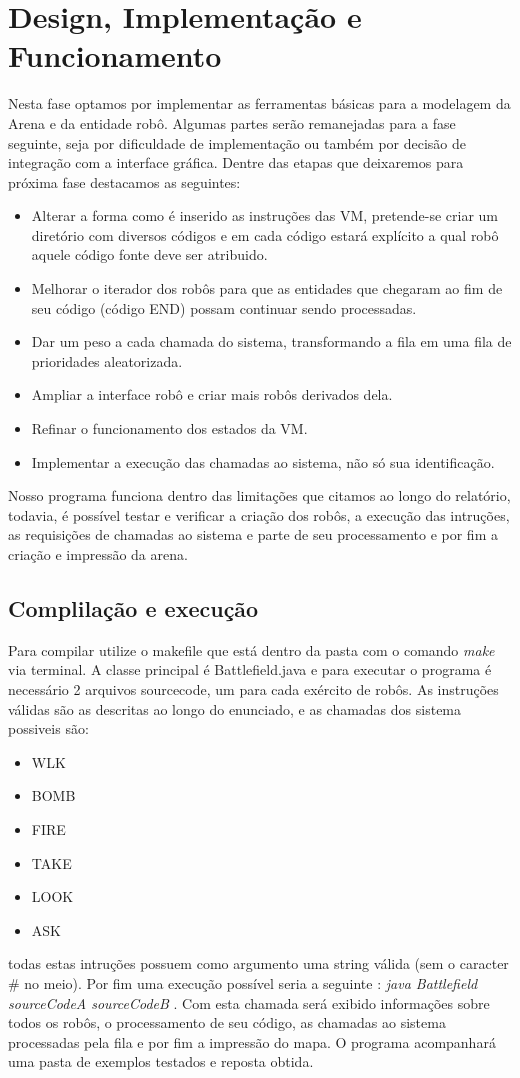 \documentclass[a4paper]{article}
\begin{document}
\section{Design, Implementação e Funcionamento }
Nesta fase optamos por implementar as ferramentas básicas para a modelagem da Arena e da entidade robô. Algumas partes serão remanejadas para a fase seguinte, seja por dificuldade de implementação ou também por decisão de integração com a interface gráfica. Dentre das etapas que deixaremos para próxima fase destacamos as seguintes:
\begin{itemize}
\item[]{Alterar a forma como é inserido as instruções das VM, pretende-se criar um diretório com diversos códigos e em cada código estará explícito a qual robô aquele código fonte deve ser atribuido.}
\item[]{Melhorar o iterador dos robôs para que as entidades que chegaram ao fim de seu código (código END) possam continuar sendo processadas.}
\item[]{Dar um peso a cada chamada do sistema, transformando a fila em uma fila de prioridades aleatorizada.}
\item[]{Ampliar a interface robô e criar mais robôs derivados dela.}
\item[]{Refinar o funcionamento dos estados da VM.}
\item[]{Implementar a execução das chamadas ao sistema, não só sua identificação.}
\end{itemize}

Nosso programa funciona dentro das limitações que citamos ao longo do relatório, todavia, é possível testar e verificar a criação dos robôs, a execução das intruções, as requisições de chamadas ao sistema e parte de seu processamento e por fim a criação e impressão da arena.

\subsection{Complilação e execução}
Para compilar utilize o makefile que está dentro da pasta com o comando \textit{make} via terminal. A classe principal é Battlefield.java e para executar o programa é necessário 2 arquivos sourcecode, um para cada exército de robôs. As instruções válidas são as descritas ao longo do enunciado, e as chamadas dos sistema possiveis são:

\begin{itemize}
\item[]{WLK}
\item[]{BOMB}
\item[]{FIRE}
\item[]{TAKE}
\item[]{LOOK}
\item[]{ASK}
\end{itemize}

todas estas intruções possuem como argumento uma string válida (sem o caracter \# no meio). Por fim uma execução possível seria a seguinte : \textit{java Battlefield sourceCodeA sourceCodeB} . Com esta chamada será exibido informações sobre todos os robôs, o processamento de seu código, as chamadas ao sistema processadas pela fila e por fim a impressão do mapa. O programa acompanhará uma pasta de exemplos testados e reposta obtida.
\end{document}
